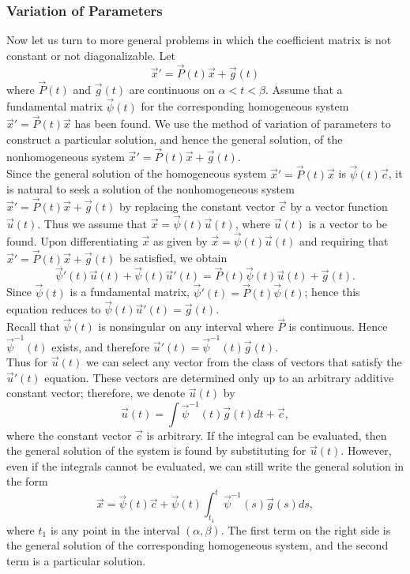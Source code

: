 \documentclass[10pt]{report}
\begin{document}
\subsubsection{Variation of Parameters}
Now let us turn to more general problems in which the coefficient matrix is not constant or not diagonalizable. Let
$$\vec{x}' = \vec{P}(t)\vec{x}+\vec{g}(t)$$
where $\vec{P}(t)$ and $\vec{g}(t)$ are continuous on $\alpha < t <\beta$. Assume that a fundamental matrix $\vec{\psi}(t)$ for the corresponding homogeneous system $\vec{x}' = \vec{P}(t)\vec{x}$ has been found. We use the method of variation of parameters to construct a particular solution, and hence the general solution, of the nonhomogeneous system $\vec{x}' = \vec{P}(t)\vec{x} + \vec{g}(t)$.\\
Since the general solution of the homogeneous system $\vec{x}' = \vec{P}(t)\vec{x}$ is $\vec{\psi}(t)\vec{c}$, it is natural to seek a solution of the nonhomogeneous system $\vec{x}' = \vec{P}(t)\vec{x} + \vec{g}(t)$ by replacing the constant vector $\vec{c}$ by a vector function $\vec{u}(t)$. Thus we assume that $\vec{x} = \vec{\psi}(t)\vec{u}(t)$, where $\vec{u}(t)$ is a vector to be found. Upon differentiating $\vec{x}$ as given by $\vec{x} = \vec{\psi}(t)\vec{u}(t)$ and requiring that $\vec{x}' = \vec{P}(t)\vec{x} + \vec{g}(t)$ be satisfied, we obtain
$$\vec{\psi}'(t)\vec{u}(t) + \vec{\psi}(t)\vec{u}'(t) = \vec{P}(t)\vec{\psi}(t) \vec{u}(t) + \vec{g}(t).$$
Since $\vec{\psi}(t)$ is a fundamental matrix, $\vec{\psi}'(t) = \vec{P}(t)\vec{\psi}(t)$; hence this equation reduces to $\vec{\psi}(t)\vec{u}'(t) = \vec{g}(t).$\\
Recall that $\vec{\psi}(t)$ is nonsingular on any interval where $\vec{P}$ is continuous. Hence $\vec{\psi}^{-1}(t)$ exists, and therefore $\vec{u}'(t)=\vec{\psi}^{-1}(t)\vec{g}(t).$\\
Thus for $\vec{u}(t)$ we can select any vector from the class of vectors that satisfy the $\vec{u}'(t)$ equation. These vectors are determined only up to an arbitrary additive constant vector; therefore, we denote $\vec{u}(t)$ by
$$\vec{u}(t) = \int \vec{\psi}^{-1}(t)\vec{g}(t)dt + \vec{c},$$
where the constant vector $\vec{c}$ is arbitrary. If the integral can be evaluated, then the general solution of the system is found by substituting for $\vec{u}(t)$. However, even if the integrals cannot be evaluated, we can still write the general solution in the form
$$\vec{x} = \vec{\psi}(t)\vec{c} + \vec{\psi}(t)\int_{t_1}^t\vec{\psi}^{-1}(s)\vec{g}(s)ds,$$
where $t_1$ is any point in the interval $(\alpha,\beta)$. The first term on the right side is the general solution of the corresponding homogeneous system, and the second term is a particular solution.\\
\end{document}
